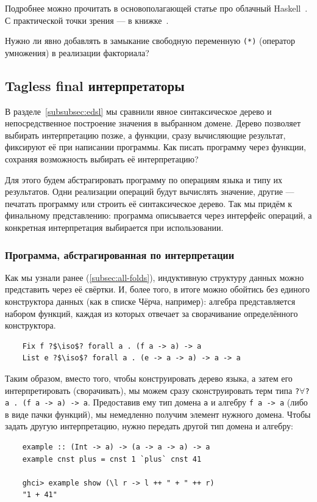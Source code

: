 Подробнее можно прочитать в основополагающей статье про облачный Haskell~\cite{epstein2011towards}.
С практической точки зрения --- в книжке~\cite[глава 16]{marlow2011parallel}.

\begin{task}
    Нужно ли явно добавлять в замыкание свободную переменную \texttt{(*)} (оператор умножения) в реализации факториала?
\end{task}

\subsection{Tagless final интерпретаторы} \label{subsec:tagless-final}

В разделе~\ref{subsubsec:edsl} мы сравнили явное синтаксическое дерево и непосредственное построение значения в выбранном домене.
Дерево позволяет выбирать интерпретацию позже, а функции, сразу вычисляющие результат, фиксируют её при написании программы.
Как писать программу через функции, сохраняя возможность выбирать её интерпретацию?

Для этого будем абстрагировать программу по операциям языка и типу их результатов.
Одни реализации операций будут вычислять значение, другие --- печатать программу или строить её синтаксическое дерево.
Так мы придём к финальному представлению: программа описывается через интерфейс операций, а конкретная интерпретация выбирается при использовании.

\subsubsection{Программа, абстрагированная по интерпретации} \label{subsubsec:shallow-embedding}

Как мы узнали ранее (\ref{subsec:all-folds}), индуктивную структуру данных можно представить через её свёртки.
И, более того, в итоге можно обойтись без единого конструктора данных (как в списке Чёрча, например): алгебра представляется набором функций, каждая из которых отвечает за сворачивание определённого конструктора.
\begin{verbatim}
    Fix f ?$\iso$? forall a . (f a -> a) -> a
    List e ?$\iso$? forall a . (e -> a -> a) -> a -> a
\end{verbatim}

Таким образом, вместо того, чтобы конструировать дерево языка, а затем его интерпретировать (сворачивать), мы можем сразу сконструировать терм типа \texttt{?$\forall$?a . (f a -> a) -> a}.
Предоставив ему тип домена \texttt{a} и алгебру \texttt{f a -> a} (либо в виде пачки функций), мы немедленно получим элемент нужного домена.
Чтобы задать другую интерпретацию, нужно передать другой тип домена и алгебру:
\begin{verbatim}
    example :: (Int -> a) -> (a -> a -> a) -> a
    example cnst plus = cnst 1 `plus` cnst 41

    ghci> example show (\l r -> l ++ " + " ++ r)
    "1 + 41"
\end{verbatim}

